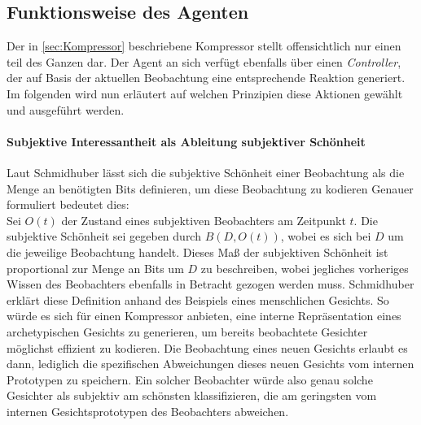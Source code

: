 


\subsection{Funktionsweise des Agenten}
Der in \ref{sec:Kompressor} beschriebene Kompressor stellt offensichtlich nur einen teil des Ganzen dar. Der Agent an sich verfügt ebenfalls über einen \emph{Controller}, der auf Basis der aktuellen Beobachtung eine entsprechende Reaktion generiert.
Im folgenden wird nun erläutert auf welchen Prinzipien diese Aktionen gewählt und ausgeführt werden.

\paragraph{Subjektive Interessantheit als Ableitung subjektiver Schönheit}
\label{sec:Beauty_und_Curiosity}
Laut Schmidhuber lässt sich die subjektive Schönheit einer Beobachtung als die Menge an benötigten Bits definieren, um diese Beobachtung zu kodieren \cite[p.~7]{curiosity_schmidhuber} 
Genauer formuliert bedeutet dies: \\
Sei \(O(t)\) der Zustand eines subjektiven Beobachters am Zeitpunkt \(t\). 
Die subjektive Schönheit sei gegeben durch \(B(D,O(t))\), wobei es sich bei \(D\) um die jeweilige Beobachtung handelt.
Dieses Maß der subjektiven Schönheit ist proportional zur Menge an Bits um \(D\) zu beschreiben, wobei jegliches vorheriges Wissen des Beobachters ebenfalls in Betracht gezogen werden muss. \cite[p.~7]{curiosity_schmidhuber}
Schmidhuber erklärt diese Definition anhand des Beispiels eines menschlichen Gesichts. So würde es sich für einen Kompressor anbieten, eine interne Repräsentation eines archetypischen Gesichts zu generieren, um bereits beobachtete Gesichter möglichst effizient zu kodieren. Die Beobachtung eines neuen Gesichts erlaubt es dann, lediglich die spezifischen Abweichungen dieses neuen Gesichts vom internen Prototypen zu speichern. Ein solcher Beobachter würde also genau solche Gesichter als subjektiv am schönsten klassifizieren, die am geringsten vom internen Gesichtsprototypen des Beobachters abweichen. \cite[p.~7]{curiosity_schmidhuber} \\

